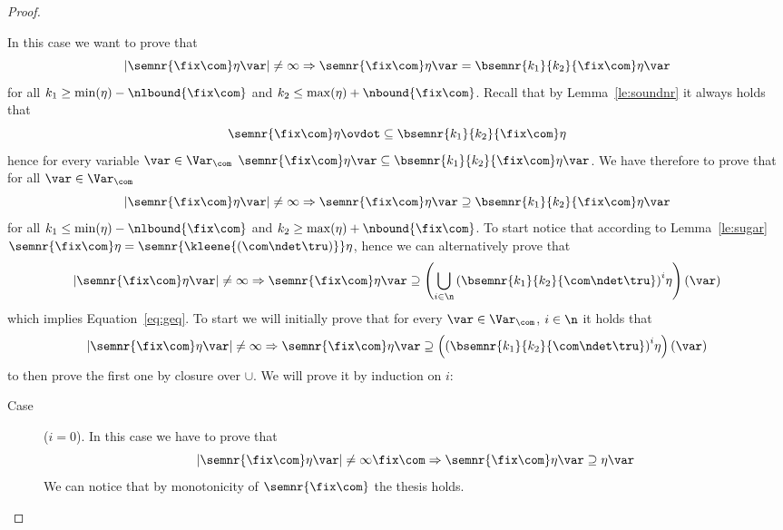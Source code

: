 \begin{proof}
\begin{inductive}
    \case{\(\fix\com\)} In this case we want to prove that
    \begin{equation*}
      |\semnr{\fix\com}\eta\var| \neq \infty \Rightarrow \semnr{\fix\com}\eta\var = \bsemnr{k_1}{k_2}{\fix\com}\eta\var
    \end{equation*}
    for all \(k_1 \geq \min(\eta) - \nlbound{\fix\com}\) and
    \(k_2 \leq \max(\eta) + \nbound{\fix\com}\). Recall that by
    Lemma~\ref{le:soundnr} it always holds that
    \begin{equation*}
      \semnr{\fix\com}\eta \ovdot\subseteq \bsemnr{k_1}{k_2}{\fix\com}\eta
    \end{equation*}
    hence for every variable \(\var \in \Var_{\com}\)
    \(\semnr{\fix\com}\eta\var \subseteq
    \bsemnr{k_1}{k_2}{\fix\com}\eta\var\). We have therefore to prove
    that for all \(\var\in \Var_{\com}\)
    \begin{equation}\label{eq:geq}
      |\semnr{\fix\com}\eta\var| \neq \infty \Rightarrow \semnr{\fix\com}\eta\var \supseteq \bsemnr{k_1}{k_2}{\fix\com}\eta\var
    \end{equation}
    for all \(k_1 \leq \min(\eta) - \nlbound{\fix\com}\) and
    \(k_2 \geq \max(\eta) + \nbound{\fix\com}\). To start notice that
    according to Lemma~\ref{le:sugar}
    \(\semnr{\fix\com}\eta = \semnr{\kleene{(\com\ndet\tru)}}\eta\),
    hence we can alternatively prove that
    \begin{equation*}
      |\semnr{\fix\com}\eta\var| \neq \infty \Rightarrow \semnr{\fix\com}\eta\var \supseteq \left(\bigcup_{i\in\n} {\left(\bsemnr{k_1}{k_2}{\com \ndet \tru}\right)}^i\eta\right)(\var)
    \end{equation*}
    which implies Equation~\ref{eq:geq}. To start we will initially
    prove that for every \(\var\in\Var_{\com}\), \(i\in\n\) it holds
    that
    \begin{equation*}
      |\semnr{\fix\com}\eta\var| \neq \infty \Rightarrow
      \semnr{\fix\com}\eta\var \supseteq
      \left({\left(\bsemnr{k_1}{k_2}{\com \ndet \tru}\right)}^i\eta\right)(\var)
    \end{equation*}
    to then prove the first one by closure over \(\cup\). We will
    prove it by induction on \(i\):
    \begin{description}
      
    \item[Case] (\(i=0\)). In this case we have to prove that
      \[|\semnr{\fix\com}\eta\var| \neq \infty\fix\com \Rightarrow
        \semnr{\fix\com}\eta\var \supseteq \eta\var\] We can notice
      that by monotonicity of \(\semnr{\fix\com}\) the thesis holds.
      

\end{description}
\end{inductive}
\end{proof}
